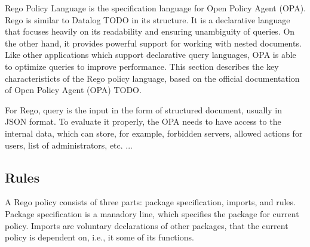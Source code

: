 

Rego Policy Language is the specification language for Open Policy Agent (OPA).
Rego is similar to Datalog TODO in its structure.
It is a declarative language that focuses heavily on its readability and ensuring unambiguity of queries.
On the other hand, it provides powerful support for working with nested documents.
Like other applications which support declarative query languages, OPA is able to optimize queries to improve performance.
This section describes the key characteristicts of the Rego policy language, based on the official documentation of Open Policy Agent (OPA) TODO.


For Rego, query is the input in the form of structured document, usually in JSON format.
To evaluate it properly, the OPA needs to have access to the internal data, which can store, for example, forbidden servers, allowed actions for users, list of administrators, etc.
...

\subsection{Rules}

A Rego policy consists of three parts: package specification, imports, and rules.
Package specification is a manadory line, which specifies the package for current policy.
Imports are voluntary declarations of other packages, that the current policy is dependent on, i.e., it some of its functions.


